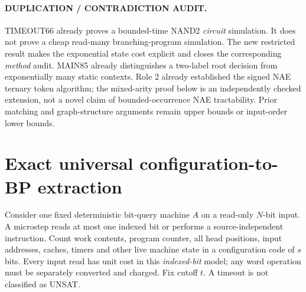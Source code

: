 \documentclass[11pt]{article}
\begin{document}
\paragraph{DUPLICATION / CONTRADICTION AUDIT.}
TIMEOUT66 already proves a bounded-time NAND2 \emph{circuit} simulation. It does not prove a cheap read-many branching-program simulation. The new restricted result makes the exponential state cost explicit and closes the corresponding \emph{method} audit. MAIN85 already distinguishes a two-label root decision from exponentially many static contexts. Role 2 already established the signed NAE ternary token algorithm; the mixed-arity proof below is an independently checked extension, not a novel claim of bounded-occurrence NAE tractability. Prior matching and graph-structure arguments remain upper bounds or input-order lower bounds.

\section{Exact universal configuration-to-BP extraction}
Consider one fixed deterministic bit-query machine $A$ on a read-only $N$-bit input. A microstep reads at most one indexed bit or performs a source-independent instruction. Count work contents, program counter, all head positions, input addresses, caches, timers and other live machine state in a configuration code of $s$ bits. Every input read has unit cost in this \emph{indexed-bit} model; any word operation must be separately converted and charged. Fix cutoff $t$. A timeout is not classified as UNSAT.
\end{document}
